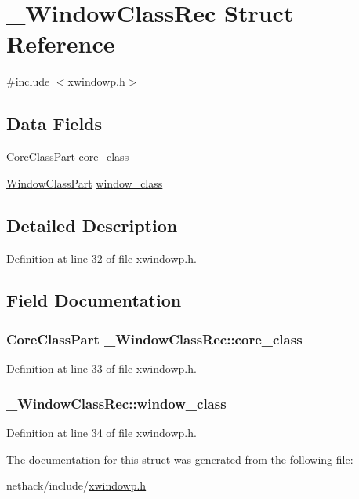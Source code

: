 \hypertarget{struct__WindowClassRec}{\section{\+\_\+\+Window\+Class\+Rec Struct Reference}
\label{struct__WindowClassRec}
}


{\ttfamily \#include $<$xwindowp.\+h$>$}

\subsection*{Data Fields}
\begin{DoxyCompactItemize}
\item 
Core\+Class\+Part \hyperlink{struct__WindowClassRec_a1338a75991c9f73dfbbfa6f86f22838e}{core\+\_\+class}
\item 
\hyperlink{structWindowClassPart}{Window\+Class\+Part} \hyperlink{struct__WindowClassRec_afddc4424f71b76ba7b79897cf9099df2}{window\+\_\+class}
\end{DoxyCompactItemize}


\subsection{Detailed Description}


Definition at line 32 of file xwindowp.\+h.



\subsection{Field Documentation}
\hypertarget{struct__WindowClassRec_a1338a75991c9f73dfbbfa6f86f22838e}{
\subsubsection[{core\+\_\+class}]{\setlength{\rightskip}{0pt plus 5cm}Core\+Class\+Part \+\_\+\+Window\+Class\+Rec\+::core\+\_\+class}}\label{struct__WindowClassRec_a1338a75991c9f73dfbbfa6f86f22838e}


Definition at line 33 of file xwindowp.\+h.

\hypertarget{struct__WindowClassRec_afddc4424f71b76ba7b79897cf9099df2}{
\subsubsection[{window\+\_\+class}]{ \+\_\+\+Window\+Class\+Rec\+::window\+\_\+class}}\label{struct__WindowClassRec_afddc4424f71b76ba7b79897cf9099df2}


Definition at line 34 of file xwindowp.\+h.



The documentation for this struct was generated from the following file\+:\begin{DoxyCompactItemize}
\item 
nethack/include/\hyperlink{xwindowp_8h}{xwindowp.\+h}\end{DoxyCompactItemize}
